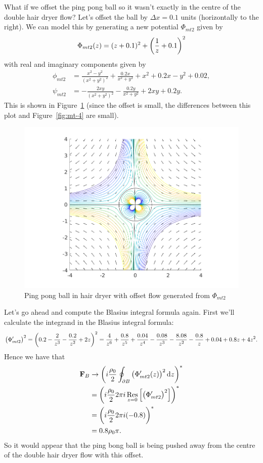 \documentclass{article}
\DeclareMathOperator*{\res}{Res}
\def\*#1{\mathbf{#1}}
\begin{document}
What if we offset the ping pong ball so it wasn't exactly in the centre
of the double hair dryer flow? Let's offset the ball by $\Delta x =
0.1$ units (horizontally to the right). We can model this by generating a
new potential $\Phi_{mt2}$ given by
%
\begin{equation*}
    \Phi_{mt2}(z) = (z + 0.1)^2 + \del{\frac{1}{z} + 0.1}^2
\end{equation*}
%
with real and imaginary components given by
%
\begin{align*}
    \phi_{mt2} &= \frac{x^2 - y^2}{(x^2 + y^2)^2} + \frac{0.2 x}{x^2 + y^2} + x^2 + 0.2x - y^2 + 0.02, \\
    \psi_{mt2} &= - \frac{2 x y}{(x^2 + y^2)^2} - \frac{0.2 y}{x^2 + y^2} + 2 x y + 0.2 y
    .
\end{align*}
%
This is shown in Figure~\ref{fig:mt-5} (since the offset is small,
the differences between this plot and Figure~\ref{fig:mt-4} are
small).
%
\begin{figure}[ht]
    \includegraphics[width=35em]{mt_ex2_3}
    \centering
    \caption{Ping pong ball in hair dryer with offset flow generated from $\Phi_{mt2}$}
    \label{fig:mt-5}
\end{figure}
%
Let's go ahead and compute the Blasius integral formula again. First
we'll calculate the integrand in the Blasius integral formula:
%
\begin{equation*}
    \del{\Phi^\prime_{mt2}}^2
        = \del{0.2 - \frac{2}{z^3} - \frac{0.2}{z^2} + 2 z}^2
        = \frac{4}{z^6} + \frac{0.8}{z^5} + \frac{0.04}{z^4} - \frac{0.08}{z^3} - \frac{8.08}{z^2} - \frac{0.8}{z} + 0.04 + 0.8 z + 4 z^2
        .
\end{equation*}
%
Hence we have that
%
\begin{align*}
    \*F_B
        &\to \del{i \frac{\rho_0}{2} \oint_{\partial B} \del{\Phi_{mt2}^\prime(z)}^2 \dif z}^* \\
        &= \del{i \frac{\rho_0}{2} 2 \pi i \res_{z = 0} \sbr{\del{\Phi^\prime_{mt2}}^2}}^* \\
        &= \del{i \frac{\rho_0}{2} 2 \pi i (-0.8)}^* \\
        &= 0.8 \rho_0 \pi
    .
\end{align*}
%
So it would appear that the ping bong ball is being pushed away from the
centre of the double hair dryer flow with this offset.
\end{document}
